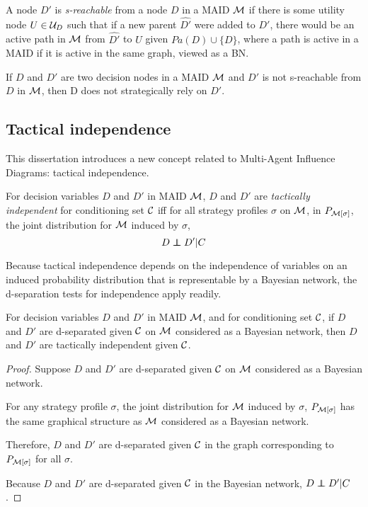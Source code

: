 \documentclass[../thesis.tex]{subfiles}
\begin{document}
\begin{dfn}[s-reachable]
  \label{dfn:s-reachable}
  A node $D'$ is \emph{s-reachable} from a node $D$ in a MAID
  $\mathcal{M}$ if there is some utility node $U \in \mathcal{U}_D$ such
  that if a new parent $\widehat{D'}$ were added to $D'$, there would
  be an active path in $\mathcal{M}$ from $\widehat{D'}$ to $U$ given
  $Pa(D) \cup \{D\}$, where a path is active in a MAID if it
  is active in the same graph, viewed as a BN.
\end{dfn}

\begin{thm}
  \label{thm:strategic-non-reliance}
  If $D$ and $D'$ are two decision nodes in a MAID $\mathcal{M}$
  and $D'$ is not s-reachable from $D$ in $\mathcal{M}$, then D
  does not strategically rely on $D'$.
\end{thm}

\subsection{Tactical independence}

This dissertation introduces a new concept
related to Multi-Agent Influence Diagrams: tactical independence.

\begin{dfn}
  \label{dfn:tactical-independence}
  For decision variables $D$ and $D'$ in MAID $\mathcal{M}$,
  $D$ and $D'$ are \emph{tactically independent} for
  conditioning set $\mathcal{C}$ iff
  for all strategy profiles $\sigma$ on $\mathcal{M}$,
  in $P_{\mathcal{M}[\sigma]}$, the joint distribution for
  $\mathcal{M}$ induced by $\sigma$,
  $$D \independent D' \vert C$$
\end{dfn}

Because tactical independence depends on the
independence of variables on an induced probability
distribution that is representable by a Bayesian
network, the d-separation tests for independence
apply readily.

\begin{thm}
  For decision variables $D$ and $D'$ in MAID $\mathcal{M}$,
  and for conditioning set $\mathcal{C}$, if
  $D$ and $D'$ are d-separated given $\mathcal{C}$ on
  $\mathcal{M}$ considered as a Bayesian network,
  then $D$ and $D'$ are tactically independent
  given $\mathcal{C}$.
\end{thm}

\begin{proof}
  Suppose $D$ and $D'$ are d-separated given $\mathcal{C}$
  on $\mathcal{M}$ considered as a Bayesian network.

  For any strategy profile $\sigma$,
  the joint distribution for $\mathcal{M}$
  induced by $\sigma$, $P_{\mathcal{M}[\sigma]}$
  has the same graphical structure as $\mathcal{M}$
  considered as a Bayesian network.

  Therefore, $D$ and $D'$ are d-separated given $\mathcal{C}$
  in the graph corresponding to $P_{\mathcal{M}[\sigma]}$
  for all $\sigma$.

  Because $D$ and $D'$ are d-separated given $\mathcal{C}$
  in the Bayesian network, $D \independent D' \vert C$.
\end{proof}
\end{document}
